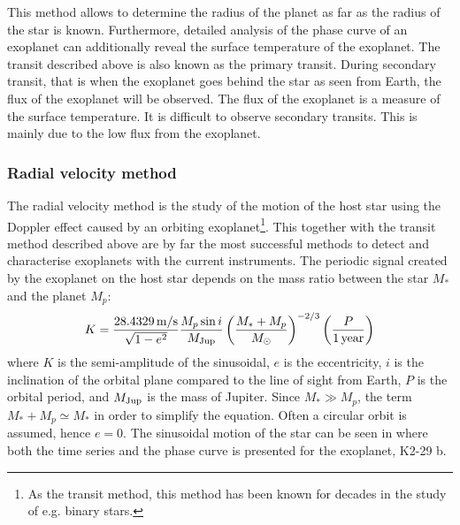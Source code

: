 This method allows to determine the radius of the planet as far as the radius of the star is known.
Furthermore, detailed analysis of the phase curve of an exoplanet can additionally reveal the
surface temperature of the exoplanet. The transit described above is also known as the primary
transit. During secondary transit, that is when the exoplanet goes behind the star as seen from
Earth, the flux of the exoplanet will be observed. The flux of the exoplanet is a measure of the
surface temperature. It is difficult to observe secondary transits. This is mainly due to the low
flux from the exoplanet.



\subsubsection{Radial velocity method}
\label{sec:rvmethod}

The radial velocity method is the study of the motion of the host star using the Doppler effect
caused by an orbiting exoplanet\footnote{As the transit method, this method has been known for
decades in the study of e.g. binary stars.}. This together with the transit method described above
are by far the most successful methods to detect and characterise exoplanets  with the current
instruments. The periodic signal created by the exoplanet on the host star depends on the mass ratio
between the star $M_\ast$ and the planet $M_p$:
\begin{align}
  K = \frac{\SI{28.4329}{m/s}}{\sqrt{1-e^2}} \frac{M_p\sin i}{M_\mathrm{Jup}} \left( \frac{M_\ast+M_p}{M_\odot} \right)^{-2/3} \left(\frac{P}{\SI{1}{year}}\right)  \label{eq:rv}
\end{align}
where $K$ is the semi-amplitude of the sinusoidal, $e$ is the eccentricity, $i$ is the inclination
of the orbital plane compared to the line of sight from Earth, $P$ is the orbital period, and
$M_\mathrm{Jup}$ is the mass of Jupiter. Since $M_\ast \gg M_p$, the term $M_\ast+M_p\simeq M_\ast$ in order
to simplify the equation. Often a circular orbit is assumed, hence $e=0$. The sinusoidal motion of
the star can be seen in  where both the time series and the phase curve is
presented for the exoplanet, K2-29 b.

